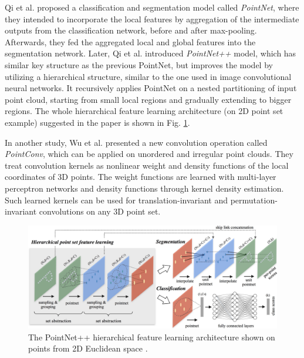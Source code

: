 \noindent Qi et al. \cite{DBLP:journals/corr/QiSMG16} proposed a classification and segmentation model called \textit{PointNet}, where they intended to incorporate the local features by aggregation of the intermediate outputs from the classification network, before and after max-pooling. Afterwards, they fed the aggregated local and global features into the segmentation network. Later, Qi et al. \cite{DBLP:journals/corr/QiYSG17} introduced \textit{PointNet++} model, which has similar key structure as the previous PointNet, but improves the model by utilizing a hierarchical structure, similar to the one used in image convolutional neural networks. It recursively applies PointNet on a nested partitioning of input point cloud, starting from small local regions and gradually extending to bigger regions. The whole hierarchical feature learning architecture (on 2D point set example) suggested in the paper is shown in Fig. \ref{fig:Pointnet2}. \par

\vspace{5mm}

\noindent In another study, Wu et al. \cite{DBLP:journals/corr/abs-1811-07246} presented a new convolution operation called \textit{PointConv}, which can be applied on unordered and irregular point clouds. They treat convolution kernels as nonlinear weight and density functions of the local coordinates of 3D points. The weight functions are learned with multi-layer perceptron networks and density functions through kernel density estimation. Such learned kernels can be used for translation-invariant and permutation-invariant convolutions on any 3D point set. \par
\vspace{5mm}
\begin{figure}[H]
\begin{center}
  \includegraphics[width=\textwidth]{images/related_work/pointnet2.jpg}
  \caption[The PointNet++ hierarchical feature learning architecture \cite{DBLP:journals/corr/QiYSG17}.]{The PointNet++ hierarchical feature learning architecture shown on points from 2D Euclidean space \cite{DBLP:journals/corr/QiYSG17}.}
  \label{fig:Pointnet2}
\end{center}
\end{figure}

